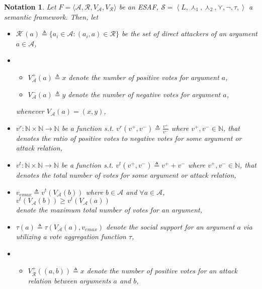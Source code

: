 \documentclass{article}
\newtheorem{notation}{Notation}
\newcommand{\nat}{\mathbb{N}}   %
\newcommand{\args}{\mathcal{A}} %
\newcommand{\att}{\mathcal{R}}  %
\newcommand{\valueset}{L}
\newcommand{\varg}{V_{\args}}   %
\newcommand{\vargpro}[1]{\varg^+\left(#1\right)} %
\newcommand{\vargcon}[1]{\varg^-\left(#1\right)} %
\newcommand{\vargtot}[1]{\varg^{max}\left(#1\right)} %
\newcommand{\vatt}{V_{\att}}   %
\newcommand{\vattpro}[1]{\vatt^+\left(#1\right)} %
\newcommand{\attackers}[1]{\att^\text{-}\left(#1\right)}
\newcommand{\safid}{F}               %
\newcommand{\saf}{\safid = \safbody} %
\newcommand{\safbody}{\langle \args, \att, \varg, \vatt \rangle} %
\newcommand{\sembodyNew}{\left\langle \valueset,\SAFand_1, \SAFand_2,\SAFor,\lnot,\tau, \right\rangle} %
\newcommand{\SAFand}{\curlywedge}     %
\newcommand{\SAFor}{\curlyvee}        %
\newcommand{\sem}{\mathcal{S}}
\begin{document}
\begin{notation}
Let $\saf$ be an ESAF, $\sem = \sembodyNew$ a semantic framework. Then, let
\begin{itemize}
\item $\attackers{a} \triangleq \{a_i \in \args: (a_i, a) \in \att\}$ be the set of direct attackers of an argument $a \in \args$, 
\item 
\begin{itemize}
\item $\vargpro a \triangleq x$ denote the number of positive votes for argument $a$,
\item $\vargcon a \triangleq y$ denote the number of negative votes for argument $a$,
\end{itemize}
whenever $\varg (a) = (x, y)$,
\item $v^r: \nat \times \nat \to \nat$ be a function s.t. $v^r(v^{+}, v^{-}) \triangleq \frac{v^{+}}{v^{-}}$ where $v^{+}, v^{-} \in \mathbb{N}$, that denotes the ratio of positive votes to negative votes for some argument or attack relation,
\item $v^t: \nat \times \nat \to \nat$ be a function s.t. $v^t(v^{+}, v^{-}) \triangleq v^{+} + v^{-}$ where $v^{+}, v^{-} \in \mathbb{N}$, that denotes the total number of votes for some argument or attack relation,
\item $v_{emax} \triangleq v^t(\varg(b))$ where $b \in \args$ and $\forall a \in \args$, $v^t(\varg(b)) \ge v^t(\varg(a))$ 
\\  denote the maximum total number of votes for an argument,
\item $\tau(a) \triangleq \tau(V_{\mathcal{A}}(a), v_{emax})$ denote the social support for an argument $a$ via utilizing a vote aggregation function $\tau$,%
\item
\begin{itemize}
\item $\vattpro{(a, b)} \triangleq x$ denote the number of positive votes for an attack relation between arguments  $a$ and $b$,

\end{itemize}
\end{itemize}
\end{notation}
\end{document}

